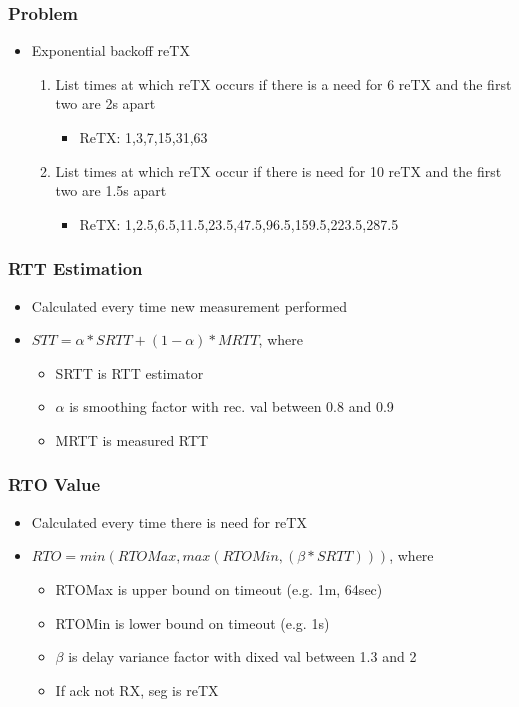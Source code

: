 \documentclass[a4paper]{article}
\begin{document}
\subsubsection{Problem}
\begin{itemize}
	\item Exponential backoff reTX
	\begin{enumerate}
		\item List times at which reTX occurs if there is a need for 6
			reTX and the first two are 2s apart
		\begin{itemize}
			\item ReTX: 1,3,7,15,31,63
		\end{itemize}
		\item List times at which reTX occur if there is need for 10
			reTX and the first two are 1.5s apart
		\begin{itemize}
			\item ReTX:
				1,2.5,6.5,11.5,23.5,47.5,96.5,159.5,223.5,287.5
		\end{itemize}
	\end{enumerate}
\end{itemize}
\subsubsection{RTT Estimation}
\begin{itemize}
	\item Calculated every time new measurement performed
	\item $STT = \alpha * SRTT+(1-\alpha)*MRTT$, where
	\begin{itemize}
		\item SRTT is RTT estimator
		\item $\alpha$ is smoothing factor with rec. val between 0.8 and
			0.9
		\item MRTT is measured RTT
	\end{itemize}
\end{itemize}
\subsubsection{RTO Value}
\begin{itemize}
	\item Calculated every time there is need for reTX
	\item $RTO = min (RTOMax, max(RTOMin,(\beta * SRTT)))$, where
	 \begin{itemize}
		\item RTOMax is upper bound on timeout (e.g. 1m, 64sec)
		\item RTOMin is lower bound on timeout (e.g. 1s)
		\item $\beta$ is delay variance factor with dixed val between
			1.3 and 2
		\item If ack not RX, seg is reTX
	\end{itemize}
\end{itemize}
\end{document}
